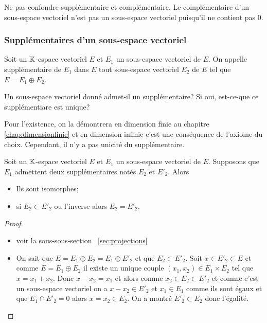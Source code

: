 Ne pas confondre supplémentaire et complémentaire. Le complémentaire d'un sous-espace vectoriel n'est pas un sous-espace vectoriel puisqu'il ne contient pas \(0\).

\subsubsection{Supplémentaires d'un sous-espace vectoriel}

\begin{defdef}
  Soit un \(\mathbb{K}\)-espace vectoriel \(E\) et \(E_1\) un sous-espace vectoriel de \(E\). On appelle supplémentaire de \(E_1\) dans \(E\) tout sous-espace vectoriel \(E_2\) de \(E\) tel que \(E= E_1 \oplus E_2\).
\end{defdef}

Un sous-espace vectoriel donné admet-il un supplémentaire? Si oui, est-ce-que ce supplémentiare est unique?

Pour l'existence, on la démontrera en dimension finie au chapitre~
\ref{chap:dimensionfinie} et en dimension infinie c'est une conséquence de l'axiome du choix. Cependant, il n'y a pas unicité du supplémentaire.

\begin{prop}\label{prop:deuxsuppiso}
  Soit un \(\mathbb{K}\)-espace vectoriel \(E\) et \(E_1\) un sous-espace vectoriel de \(E\). Supposons que \(E_1\) admettent deux supplémentaires notés \(E_2\) et \(E'_2\). Alors
  \begin{itemize}
  \item Ils sont isomorphes;
  \item si \(E_2 \subset E'_2\) ou l'inverse alors \(E_2=E'_2\).
  \end{itemize}
\end{prop}
\begin{proof}
  \begin{itemize}
  \item voir la sous-sous-section~
\ref{sec:projections}
  \item On sait que \(E=E_1 \oplus E_2=E_1 \oplus E'_2\) et que \(E_2 \subset E'_2\). Soit \(x \in E'_2 \subset E\) et comme \(E=E_1 \oplus E_2\) il existe un unique couple \((x_1,x_2 ) \in E_1 \times E_2\) tel que \(x=x_1+x_2\). Donc \(x-x_2=x_1\) et alors comme \(x_2 \in E_2 \subset E'_2\) et comme c'est un sous-espace vectoriel on a \(x-x_2\in E'_2\)  et \(x_1 \in E_1\) comme ils sont égaux et que \(E_1 \cap E'_2=0\)  alors \(x=x_2 \in E_2\). On a montré \(E'_2 \subset E_2\) donc l'égalité.
  \end{itemize}
\end{proof}

